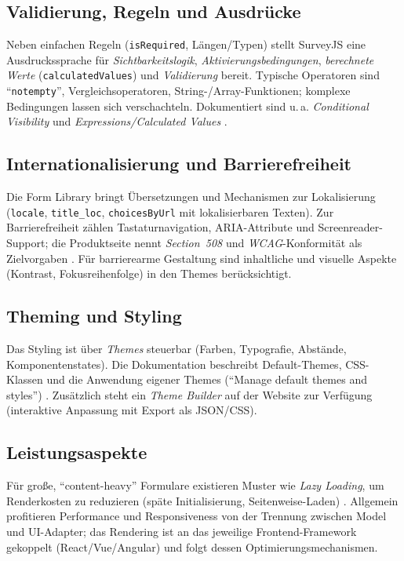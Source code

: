 \documentclass[11pt,a4paper]{article}
\begin{document}
\subsection*{Validierung, Regeln und Ausdrücke}
Neben einfachen Regeln (\texttt{isRequired}, Längen/Typen) stellt SurveyJS eine Ausdruckssprache für \emph{Sichtbarkeitslogik}, \emph{Aktivierungsbedingungen}, \emph{berechnete Werte} (\texttt{calculatedValues}) und \emph{Validierung} bereit. Typische Operatoren sind \enquote{\texttt{notempty}}, Vergleichsoperatoren, String-/Array-Funktionen; komplexe Bedingungen lassen sich verschachteln. Dokumentiert sind u.\,a. \emph{Conditional Visibility} und \emph{Expressions/Calculated Values} \cite{surveyjs-docs-conditional, surveyjs-docs-expressions, surveyjs-blog-expressions}. 

\subsection*{Internationalisierung und Barrierefreiheit}
Die Form Library bringt Übersetzungen und Mechanismen zur Lokalisierung (\texttt{locale}, \texttt{title\_loc}, \texttt{choicesByUrl} mit lokalisierbaren Texten). Zur Barrierefreiheit zählen Tastaturnavigation, ARIA-Attribute und Screenreader-Support; die Produktseite nennt \emph{Section~508} und \emph{WCAG}-Konformität als Zielvorgaben \cite{surveyjs-accessibility, surveyjs-products}. Für barrierearme Gestaltung sind inhaltliche und visuelle Aspekte (Kontrast, Fokusreihenfolge) in den Themes berücksichtigt.

\subsection*{Theming und Styling}
Das Styling ist über \emph{Themes} steuerbar (Farben, Typografie, Abstände, Komponentenstates). Die Dokumentation beschreibt Default-Themes, CSS-Klassen und die Anwendung eigener Themes (\enquote{Manage default themes and styles}) \cite{surveyjs-themes-styles}. Zusätzlich steht ein \emph{Theme Builder} auf der Website zur Verfügung (interaktive Anpassung mit Export als JSON/CSS).

\subsection*{Leistungsaspekte}
Für große, \enquote{content-heavy} Formulare existieren Muster wie \emph{Lazy Loading}, um Renderkosten zu reduzieren (späte Initialisierung, Seitenweise-Laden) \cite{surveyjs-lazy-loading}. Allgemein profitieren Performance und Responsiveness von der Trennung zwischen Model und UI-Adapter; das Rendering ist an das jeweilige Frontend-Framework gekoppelt (React/Vue/Angular) und folgt dessen Optimierungsmechanismen.
\end{document}
